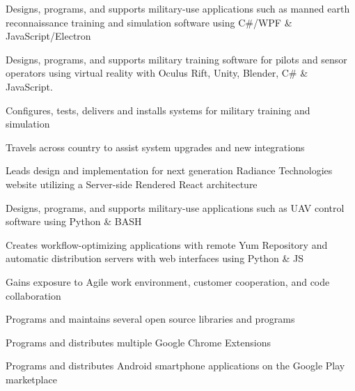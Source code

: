\documentclass[]{resume}
\begin{document}
\begin{minipage}[t]{0.66\textwidth}
\begin{tightemize}
\item Designs, programs, and supports military-use applications such as manned earth reconnaissance training and simulation software using C\#/WPF \& JavaScript/Electron
\item Designs, programs, and supports military training software for pilots and sensor operators using virtual reality with Oculus Rift, Unity, Blender, C\# \& JavaScript.
\item Configures, tests, delivers and installs systems for military training and simulation
\item Travels across country to assist system upgrades and new integrations
\item Leads design and implementation for next generation Radiance Technologies website utilizing a Server-side Rendered React architecture
\end{tightemize}

\sectionsep

\begin{tightemize}
\item Designs, programs, and supports military-use applications such as UAV control software using Python \& BASH
\item Creates workflow-optimizing applications with remote Yum Repository and automatic distribution servers with web interfaces using Python \& JS
\item Gains exposure to Agile work environment, customer cooperation, and code collaboration
\end{tightemize}

\sectionsep

\descript{}
\begin{tightemize}
\item Programs and maintains several open source libraries and programs
\item Programs and distributes multiple Google Chrome Extensions
\item Programs and distributes Android smartphone applications on the Google Play marketplace
\end{tightemize}


\end{minipage}
\end{document}
